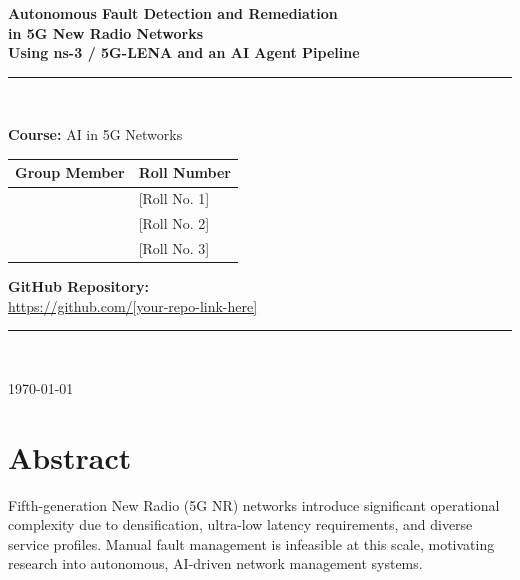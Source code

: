 \documentclass[12pt,a4paper]{article}
\begin{document}

\begin{titlepage}
  \centering
  \vspace*{1.5cm}
  {\LARGE\bfseries\color{nrblue}
    Autonomous Fault Detection and Remediation\\[6pt]
    in 5G New Radio Networks\\[2pt]
    Using ns-3 / 5G-LENA and an AI Agent Pipeline\par}
  \vspace{1.2cm}
  \rule{\linewidth}{0.8pt}\\[0.4cm]
  {\large\textbf{Course:} AI in 5G Networks\par}
  \vspace{0.6cm}
  \begin{tabular}{ll}
    \textbf{Group Member} & \textbf{Roll Number} \\
    \midrule
    [Name 1] & [Roll No. 1] \\
    [Name 2] & [Roll No. 2] \\
    [Name 3] & [Roll No. 3] \\
  \end{tabular}
  \vspace{1.0cm}

  {\large\textbf{GitHub Repository:}\\[4pt]
  \url{https://github.com/[your-repo-link-here]}\par}
  \vspace{1.0cm}
  \rule{\linewidth}{0.8pt}\\[0.4cm]
  {\large\today\par}
\end{titlepage}

\tableofcontents
\newpage

\section*{Abstract}

Fifth-generation New Radio (5G NR) networks introduce significant operational
complexity due to densification, ultra-low latency requirements, and diverse
service profiles. Manual fault management is infeasible at this scale, motivating
research into autonomous, AI-driven network management systems.
\end{document}
